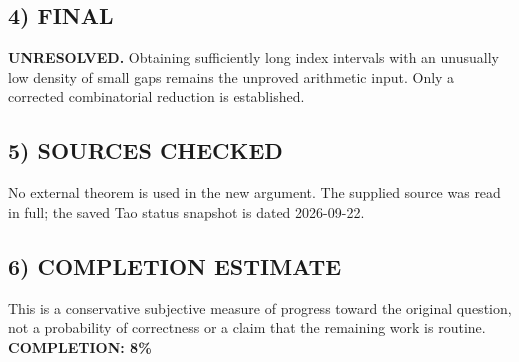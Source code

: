 \subsection{4) FINAL}
\textbf{UNRESOLVED.}
Obtaining sufficiently long index intervals with an unusually low density of small gaps remains the unproved arithmetic input. Only a corrected combinatorial reduction is established.
\subsection{5) SOURCES CHECKED}
No external theorem is used in the new argument. The supplied source was read in full; the saved Tao status snapshot is dated 2026-09-22.
\subsection{6) COMPLETION ESTIMATE}
This is a conservative subjective measure of progress toward the original question, not a probability of correctness or a claim that the remaining work is routine.
\textbf{COMPLETION: 8\%}
